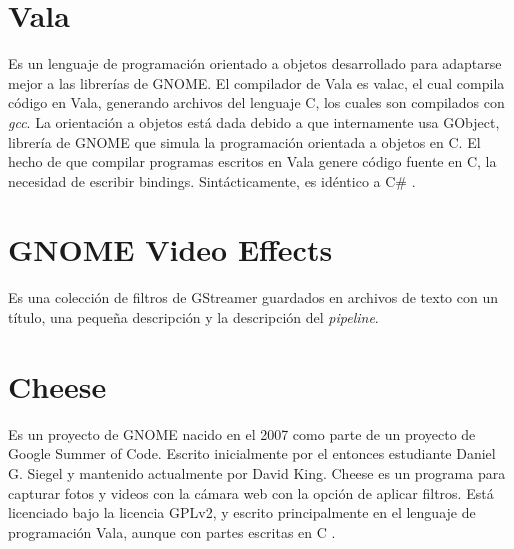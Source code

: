 \documentclass[a4paper,openright,12pt]{report}
\begin{document}
\section{Vala}
Es un lenguaje de programación orientado a objetos desarrollado para adaptarse
mejor a las librerías de GNOME. El compilador de Vala es valac, el cual compila
código en Vala, generando archivos del lenguaje C, los cuales son compilados con
\textit{gcc}. La orientación a objetos está dada debido a que internamente usa
\gls{GObject}, librería de GNOME que simula la programación orientada a objetos en C.
El hecho de que compilar programas escritos en Vala genere código fuente en C,
la necesidad de escribir bindings. Sintácticamente, es idéntico a C\#
\cite{valaOverview}.
\section{GNOME Video Effects}
Es una colección de filtros de GStreamer \cite{GNOMEVideoEffects} guardados en
archivos de texto con un título, una pequeña descripción y la descripción del
\textit{pipeline}.
\section{Cheese}
Es un proyecto de GNOME nacido en el 2007 como parte de un proyecto de Google
Summer of Code. Escrito inicialmente por el entonces estudiante Daniel G. Siegel
y mantenido actualmente por David King. Cheese es un programa para capturar
fotos y videos con la cámara web con la opción de aplicar filtros. Está
licenciado bajo la licencia GPLv2, y escrito principalmente en el lenguaje de
programación Vala, aunque con partes escritas en C \cite{cheeseReferenceManual}
\cite{cheeseApp}.\\
\end{document}
